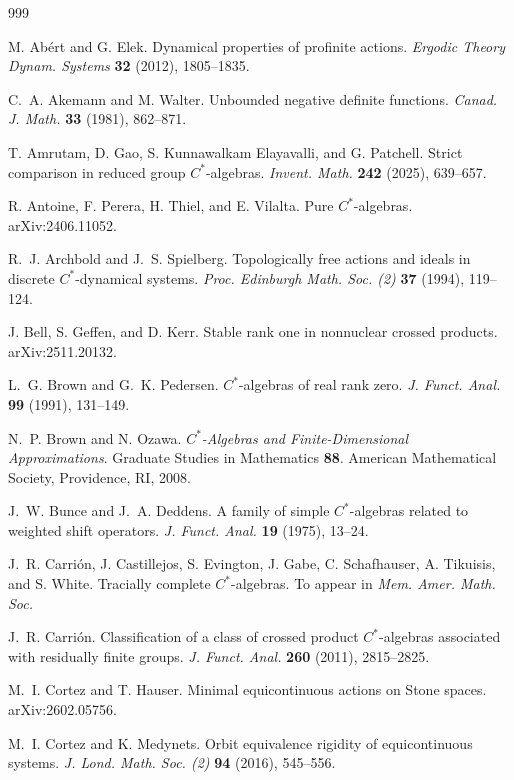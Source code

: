 \documentclass[11pt,a4,leqno]{amsart}
\theoremstyle{definition}
\theoremstyle{remark}
\numberwithin{equation}{section}
\theoremstyle{plain}
\begin{document}
\begin{thebibliography}{999}

M. Ab\'ert and G. Elek.
Dynamical properties of profinite actions.
{\it Ergodic Theory Dynam. Systems} {\bf 32} (2012), 1805--1835.

C.~A. Akemann and M. Walter.
Unbounded negative definite functions. 
{\it Canad. J. Math.} {\bf 33} (1981), 862--871.

T. Amrutam, D. Gao, S. Kunnawalkam Elayavalli, and G. Patchell. 
Strict comparison in reduced group $C^*$-algebras.
{\it Invent. Math.} {\bf 242} (2025), 639--657. 

R. Antoine, F. Perera, H. Thiel, and E. Vilalta.
Pure $C^*$-algebras.
arXiv:2406.11052. 

R.~J. Archbold and J.~S. Spielberg.
Topologically free actions and ideals in discrete $C^*$-dynamical systems.
{\it Proc. Edinburgh Math. Soc. (2)} {\bf 37} (1994), 119--124. 

J. Bell, S. Geffen, and D. Kerr.
Stable rank one in nonnuclear crossed products.
arXiv:2511.20132.

L.~G. Brown and G.~K. Pedersen. 
$C^*$-algebras of real rank zero.
{\it J. Funct. Anal.} {\bf 99} (1991), 131--149.

N.~P. Brown and N. Ozawa.
{\it $C^*$-Algebras and Finite-Dimensional Approximations}. 
Graduate Studies in Mathematics {\bf 88}. American Mathematical Society, Providence, RI, 2008.

J.~W. Bunce and J.~A. Deddens.
A family of simple $C^*$-algebras related to weighted shift operators.
{\it J. Funct. Anal.} {\bf 19} (1975), 13--24.

J.~R. Carri\'on, J. Castillejos, S. Evington, J. Gabe, C. Schafhauser, A. Tikuisis, and S. White.
Tracially complete $C^*$-algebras.
To appear in {\it Mem. Amer. Math. Soc.}

J.~R. Carri\'on.
Classification of a class of crossed product $C^*$-algebras associated with residually finite groups.
{\it J. Funct. Anal.} {\bf 260} (2011), 2815--2825.

M.~I. Cortez and T. Hauser.
Minimal equicontinuous actions on Stone spaces.
arXiv:2602.05756.

M.~I. Cortez and K. Medynets.
Orbit equivalence rigidity of equicontinuous systems.
{\it J. Lond. Math. Soc. (2)} {\bf 94} (2016), 545--556.


\end{thebibliography}
\end{document}
